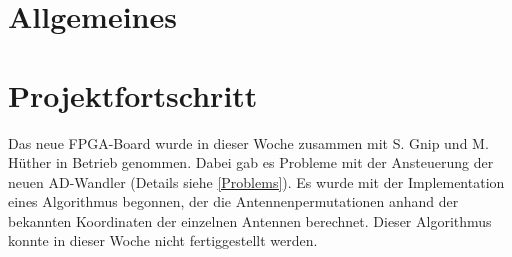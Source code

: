 \documentclass[a4paper,12pt,fleqn]{article}
\begin{document}
\setlength{\headheight}{36pt}

\begin{titlepage}



\end{titlepage}

\section[Allgemeines]{Allgemeines}
%
\section[Fortschritt]{Projektfortschritt}
%
Das neue FPGA-Board wurde in dieser Woche zusammen mit S. Gnip und M. Hüther in Betrieb genommen. Dabei gab es Probleme mit der Ansteuerung der neuen AD-Wandler (Details siehe \ref{Problems}). Es wurde mit der Implementation eines Algorithmus begonnen, der die Antennenpermutationen anhand der bekannten Koordinaten der einzelnen Antennen berechnet. Dieser Algorithmus konnte in dieser Woche nicht fertiggestellt werden.
%
\end{document}
